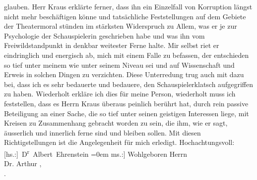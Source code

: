 \begin{ledgroupsized}[t]{13cm}
               glauben. Herr Kraus erklärte ferner, dass ihn
               ein Einzelfall von Korruption längst nicht mehr beschäftigen könne und tatsäch{\pb}liche Feststellungen auf dem Gebiete der Theatermoral
               stünden im stärksten Widerspruch zu Allem, was er je zur Psychologie der
               Schauspielerin geschrieben habe und was ihn vom Freiwildstandpunkt in denkbar
               weitester Ferne halte. Mir selbst riet er eindringlich und energisch ab, mich mit
               einem Falle zu befassen, der entschieden so tief unter meinem wie unter seinem Niveau
               sei und auf Wissenschaft und Erweis in solchen Dingen zu verzichten. Diese
               Unterredung trug auch mit dazu bei, dass ich es sehr bedauerte und bedauere, den
               Schauspielerklatsch aufgegriffen zu haben. Wiederholt erkläre ich dies für meine
               Person, wiederholt muss ich feststellen, dass es Herrn Kraus überaus peinlich berührt hat, durch rein passive
               Beteiligung an einer Sache, die so tief unter seinen geistigen Interessen liege, mit
               Kreisen zu Zusammenhang gebracht worden zu sein, die ihm, wie er sagt, äusserlich und
               innerlich ferne sind und bleiben sollen.\pend
           \pstart
           Mit diesen Richtigstellungen ist die Angelegenheit für mich erledigt.\pend
           \pstart
           Hochachtungsvoll:{\\[\baselineskip]}\spacefill\mbox{{[}hs.:{]} D\textsuperscript{r} Albert Ehrenstein}\pend
           \leftskip=0em{}\pstart
           \noindent{}{[}ms.:{]} Wohlgeboren Herrn{\\}Dr. Arthur ,{\\}.\pend
           
         
         \endnumbering{}\end{ledgroupsized}  \newcommand{\dateiname}{L02017}\newcommand{\titel}{Albert Ehrenstein an Arthur Schnitzler, 27. 4. 1911}\newcommand{\editorInnen}{Martin Anton Müller und Gerd-Hermann Susen}
      